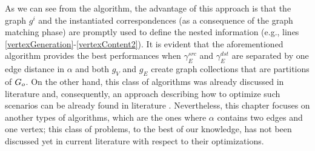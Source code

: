 As we can see from the algorithm, the advantage of this approach is that the graph $g^i$ and the instantiated correspondences (as a consequence of the graph matching phase) are promptly used to define the nested information (e.g., lines \ref{vertexGeneration}-\ref{vertexContent2}). It is evident that the aforementioned algorithm provides the best performances when $\gamma_E^{src}$ and $\gamma_E^{dst}$ are separated by  one edge distance in $\alpha$   and both $g_V$ and $g_E$ create graph collections that are partitions of $G_o$. On the other hand, this class of algorithms was already discussed in literature and, consequently, an approach describing how to optimize such  scenarios can be already found in literature \cite{JunghannsPR17}. Nevertheless, this chapter focuses on another types of algorithms, which are the ones where $\alpha$ contains two edges and one vertex; this class of problems, to the best of our knowledge, has not been discussed yet in current literature with respect to their optimizations. %

